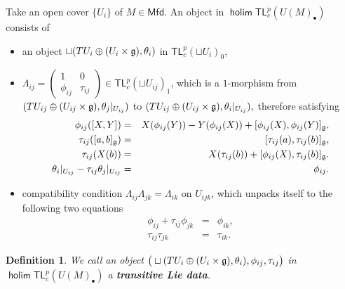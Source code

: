 \documentclass[letterpaper,10pt, oneside]{article} %
\newtheorem{defi}[thm]{Definition}
\newcommand{\Mfd}{\mathsf{Mfd}}%
\newcommand{\tlp}{{\mathsf{TL}^{p}_{c}}} %
\DeclareMathOperator{\holim}{\mathsf{holim}}
\begin{document}
Take an open cover $\{U_i\}$ of $M\in
\Mfd$. An object in  $\holim \tlp (U(M)_\bullet)$ consists of
\begin{itemize}
\item  an object $\sqcup (TU_i\oplus (U_i\times\mathfrak g),
   \theta_i)$ in $\tlp(\sqcup U_i)_0$,

\item  $\Lambda_{ij}=\left(\begin{array}{cc}
1&0\\
\phi_{ij}&\tau_{ij}
\end{array} \right) \in \tlp(\sqcup U_{ij})_1$, which is a $1$-morphism from
$
(TU_{ij}\oplus (U_{ij}\times \mathfrak g),
    \theta_j|_{U_{ij}})$ to
 $ (TU_{ij}\oplus (U_{ij}\times \mathfrak g),  \theta_i|_{U_{ij}}),$
therefore satisfying
\begin{eqnarray}
\label{eq:tl1}\phi_{ij}([X,Y])&=&X(\phi_{ij}(Y))-Y(\phi_{ij}(X))+[\phi_{ij}(X),\phi_{ij}(Y)]_\mathfrak g,\\
 \label{eq:tl2} \tau_{ij}([a,b]_\mathfrak g)&=&[\tau_{ij}(a),\tau_{ij}(b)]_\mathfrak g,\\
 \label{eq:tl3} \tau_{ij}(X(b))&=& X(\tau_{ij}(b))+[\phi_{ij}(X),\tau_{ij}(b)]_\mathfrak g.\\
  \label{eq:generalcontheta}\theta_i|_{U_{ij}}-\tau_{ij}\theta_j|_{U_{ij}}&=&\phi_{ij}.
\end{eqnarray}
\item compatibility condition $\Lambda_{ij}\Lambda_{jk}=\Lambda_{ik}$ on $U_{ijk}$, which unpacks itself to the following two equations
    \begin{eqnarray*}
      \phi_{ij}+\tau_{ij}\phi_{jk}&=&\phi_{ik},\\
      \tau_{ij}\tau_{jk}&=&\tau_{ik}.
    \end{eqnarray*}
\end{itemize}

\begin{defi}\label{Liedata}
We call an object $\big(\sqcup(TU_i\oplus(U_i\times\mathfrak g),\theta_i),\phi_{ij},\tau_{ij}\big)$ in  $\holim \tlp (U(M)_\bullet)$ a {\bf transitive Lie data}.
\end{defi}
\end{document}
